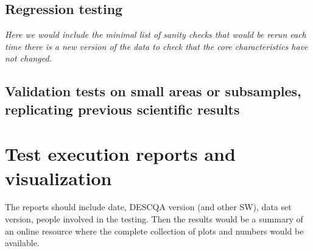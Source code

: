 \documentclass[11pt, a4paper]{article}
\begin{document}
\subsection{Regression testing}

\textit{Here we would include the minimal list of sanity checks that would be rerun each time there is a new version of the data to check that the core characteristics have not changed.}

\subsection{Validation tests on small areas or subsamples, replicating previous scientific results}



\section{Test execution reports and visualization}

The reports should include date, DESCQA version (and other SW), data set version, people involved in the testing. Then the results would be a summary of an online resource where the complete collection of plots and numbers would be available.
\end{document}
